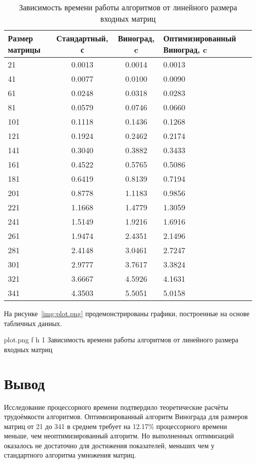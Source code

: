 \begin{table}
\centering
\caption{Зависимость времени работы алгоритмов от линейного размера входных матриц}
\begin{tabular}{|m{3cm}|c|c|m{5cm}|}
\hline
\textbf{Размер матрицы} & \textbf{Стандартный, с} & \textbf{Виноград, c} & \textbf{Оптимизированный Виноград, c} \\ \hline
21  & 0.0013 & 0.0014 & 0.0013 \\ \hline
41  & 0.0077 & 0.0100 & 0.0090 \\ \hline
61  & 0.0248 & 0.0318 & 0.0283 \\ \hline
81  & 0.0579 & 0.0746 & 0.0660 \\ \hline
101 & 0.1118 & 0.1436 & 0.1268 \\ \hline
121 & 0.1924 & 0.2462 & 0.2174 \\ \hline
141 & 0.3040 & 0.3882 & 0.3433 \\ \hline
161 & 0.4522 & 0.5765 & 0.5086 \\ \hline
181 & 0.6419 & 0.8139 & 0.7194 \\ \hline
201 & 0.8778 & 1.1183 & 0.9856 \\ \hline
221 & 1.1668 & 1.4779 & 1.3059 \\ \hline
241 & 1.5149 & 1.9216 & 1.6916 \\ \hline
261 & 1.9474 & 2.4351 & 2.1496 \\ \hline
281 & 2.4148 & 3.0461 & 2.7247 \\ \hline
301 & 2.9777 & 3.7617 & 3.3824 \\ \hline
321 & 3.6667 & 4.5926 & 4.1631 \\ \hline
341 & 4.3503 & 5.5051 & 5.0158 \\ \hline
\end{tabular}
\label{tab:comparison}
\end{table}

\clearpage

На рисунке~\ref{img:plot.png} продемонстрированы графики, построенные на основе табличных данных.

{plot.png}
{f}
{h}
{1 \textwidth} 
{Зависимость времени работы алгоритмов от линейного размера входных матриц} 

\section*{Вывод}

Исследование процессорного времени подтвердило теоретические расчёты трудоёмкости алгоритмов. Оптимизированный алгоритм Винограда для размеров матриц от 21 до 341 в среднем требует на 12.17\% процессорного времени меньше, чем неоптимизированный алгоритм. Но выполненных оптимизаций оказалось не достаточно для достижения показателей, меньших чем у стандартного алгоритма умножения матриц.

